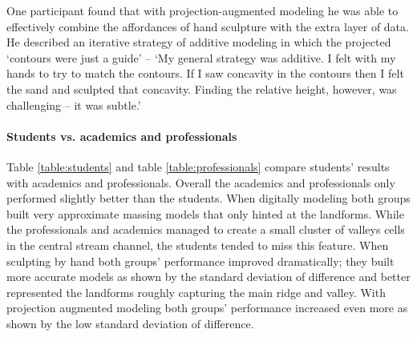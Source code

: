 \documentclass[prodmode,acmtochi]{acmsmall} %
\begin{document}
One participant found that 
with projection-augmented modeling 
he was able to effectively combine 
the affordances of hand sculpture 
with the extra layer of data. 
%
He described an iterative strategy of additive modeling
in which the projected `contours were just a guide' --  
`My general strategy was additive. 
I felt with my hands to try to match the contours. 
If I saw concavity in the contours 
then I felt the sand and sculpted that concavity.
Finding the relative height, however, was challenging -- 
it was subtle.'

\paragraph{Students vs. academics and professionals}
%
Table \ref{table:students} and table \ref{table:professionals}
compare students' results 
with academics and professionals. 
Overall the academics and professionals
only performed slightly better than the students.
When digitally modeling both groups 
built very approximate massing models
that only hinted at the landforms. 
While the professionals and academics 
managed to create a small cluster of valleys cells
in the central stream channel, 
the students tended to miss this feature. 
When sculpting by hand
both groups' performance improved dramatically;
they built more accurate models
as shown by the standard deviation of difference
and better represented the landforms
roughly capturing the main ridge and valley. 
%
With projection augmented modeling
both groups' performance increased even more
as shown by the low standard deviation of difference.
\end{document}
